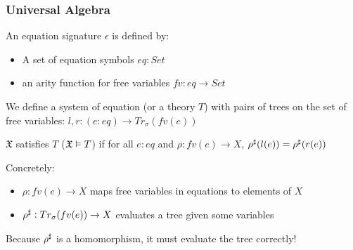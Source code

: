 \documentclass[9pt]{beamer}
\begin{document}
\begin{frame}
{}

\end{frame}

\begin{frame}
\frametitle{Universal Algebra}

An \alert{equation signature} $\epsilon$ is defined by:
\begin{itemize}
    \item A set of \alert{equation symbols} $eq : Set$
    \item an \alert{arity function} for free variables $fv : eq \to Set$
\end{itemize}

We define a system of equation (or a \alert{theory} $T$) with pairs of trees on the set of free variables:
$l, r : (e : eq) \to Tr_\sigma(fv(e))$

$\mathfrak{X}$ satisfies $T$ ($\mathfrak{X} \vDash T$) if for all $e : eq$ and $\rho : fv(e) \to X$,
${\rho}^{\sharp}(l(e)) = {\rho}^{\sharp}(r(e))$

Concretely:
\begin{itemize}
    \item $\rho : fv(e) \to X$ maps free variables in equations to elements of $X$
    \item ${\rho}^{\sharp} : Tr_\sigma(fv(e)) \to X$ evaluates a tree given some variables
\end{itemize}

Because ${\rho}^{\sharp}$ is a \alert{homomorphism}, it must evaluate the tree correctly!

\end{frame}
\end{document}
